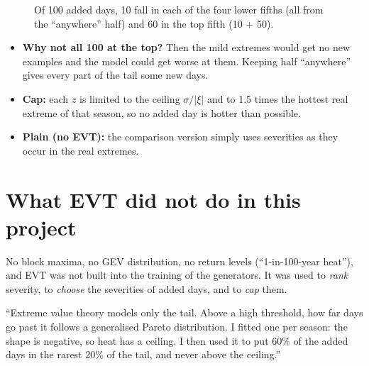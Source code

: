 \begin{figure}[H]
\centering
{}
\caption{Of 100 added days, 10 fall in each of the four lower fifths (all from the ``anywhere'' half) and 60 in the top
fifth (10 + 50).}
\end{figure}

\begin{itemize}
  \item \textbf{Why not all 100 at the top?} Then the mild extremes would get no new examples and the model could get
        worse at them. Keeping half ``anywhere'' gives every part of the tail some new days.
  \item \textbf{Cap:} each $z$ is limited to the ceiling $\sigma/|\xi|$ and to 1.5 times the hottest real extreme of
        that season, so no added day is hotter than possible.
  \item \textbf{Plain (no EVT):} the comparison version simply uses severities as they occur in the real extremes.
\end{itemize}

\section{What EVT did not do in this project}
No block maxima, no GEV distribution, no return levels (``1-in-100-year heat''), and EVT was not built into the
training of the generators. It was used to \emph{rank} severity, to \emph{choose} the severities of added days, and to
\emph{cap} them.

\begin{sayit}
``Extreme value theory models only the tail. Above a high threshold, how far days go past it follows a generalised
Pareto distribution. I fitted one per season: the shape is negative, so heat has a ceiling. I then used it to put 60\%
of the added days in the rarest 20\% of the tail, and never above the ceiling.''
\end{sayit}
